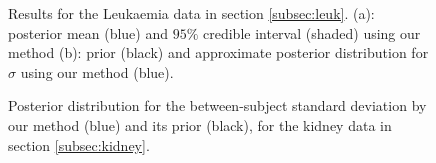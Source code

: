 \documentclass[ba]{imsart}
\begin{document}
\begin{figure}[ht]
\centering
{}
\caption{Results for the Leukaemia data in section \ref{subsec:leuk}. (a): posterior mean (blue) and $95\%$ credible interval (shaded) using our method (b): prior (black) and approximate posterior distribution for $\sigma$ using our method (blue).}
\label{fig:leuk}
\end{figure}


\begin{figure}[ht]
\centering
{}
\caption{Posterior distribution for the between-subject standard deviation by our method (blue) and its prior (black), for the kidney data in section \ref{subsec:kidney}.}
\label{fig:BetweenSubjectSD}
\end{figure}
\end{document}
